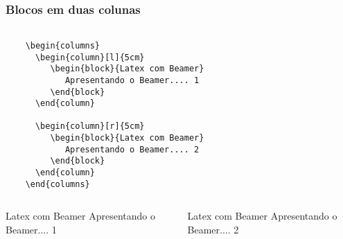 \begin{frame}[fragile]
  \frametitle{Blocos em duas colunas}

  \begin{verbatim}

    \begin{columns}
      \begin{column}[l]{5cm}
         \begin{block}{Latex com Beamer}
            Apresentando o Beamer.... 1
         \end{block}
      \end{column}

      \begin{column}[r]{5cm}
         \begin{block}{Latex com Beamer}
            Apresentando o Beamer.... 2
         \end{block}
      \end{column}
    \end{columns}
  \end{verbatim}

  \begin{columns}
    \begin{column}[l]{5cm}
       \begin{block}{Latex com Beamer}
          Apresentando o Beamer.... 1
       \end{block}
    \end{column}

    \begin{column}[r]{5cm}
       \begin{block}{Latex com Beamer}
          Apresentando o Beamer.... 2
       \end{block}
    \end{column}
  \end{columns}

\end{frame}


